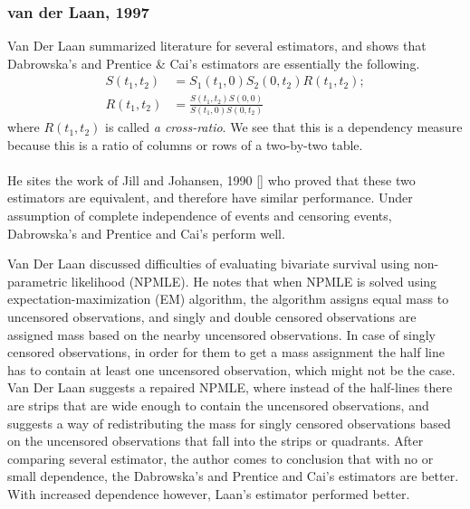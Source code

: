 \documentclass[]{article}
\begin{document}
\subsubsection{van der Laan, 1997 \cite{van1997nonparametric}}
Van Der Laan summarized literature for several estimators, and shows that Dabrowska's and Prentice \& Cai's estimators are essentially the following.
	$$
	\begin{aligned}
    S(t_1, t_2) &= S_1(t_1, 0)S_2(0, t_2)R(t_1, t_2);\\
		R(t_1, t_2) &= \frac{S(t_1, t_2)S(0, 0)}{S(t_1,0)S(0,t_2)}
 	\end{aligned}
	$$
where $R(t_1, t_2)$ is called \emph{a cross-ratio}. We see that this is a dependency measure because this is a ratio of columns or rows of a two-by-two table.\\
\\
%

He sites the work of Jill and Johansen, 1990 [\cite{gill1990survey}] who proved that these two estimators are equivalent, and therefore have similar performance. Under assumption of complete independence of events and censoring events, Dabrowska's and Prentice and Cai's perform well.

Van Der Laan discussed difficulties of evaluating bivariate survival using non-parametric likelihood (NPMLE).
He notes that when NPMLE is solved using expectation-maximization (EM) algorithm, the algorithm assigns equal mass to uncensored observations, and singly and double censored observations are assigned mass based on the nearby uncensored observations. In case of singly censored observations, in order for them to get a mass assignment the half line has to contain at least one uncensored observation, which might not be the case.\\
Van Der Laan suggests a repaired NPMLE, where instead of the half-lines there are strips that are wide enough to contain the uncensored observations, and suggests a way of redistributing the mass for singly censored observations based on the uncensored observations that fall into the strips or quadrants.
After comparing several estimator, the author comes to conclusion that with no or small dependence, the Dabrowska's and Prentice and Cai's estimators are better. With increased dependence however, Laan's estimator performed better.
\end{document}
